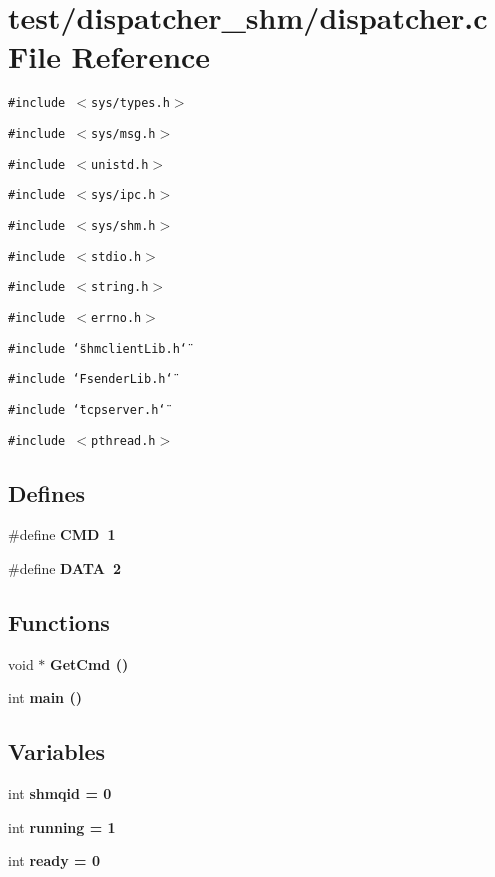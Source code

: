 \section{test/dispatcher\_\-shm/dispatcher.c File Reference}
\label{shm_2dispatcher_8c}
{\tt \#include $<$sys/types.h$>$}\par
{\tt \#include $<$sys/msg.h$>$}\par
{\tt \#include $<$unistd.h$>$}\par
{\tt \#include $<$sys/ipc.h$>$}\par
{\tt \#include $<$sys/shm.h$>$}\par
{\tt \#include $<$stdio.h$>$}\par
{\tt \#include $<$string.h$>$}\par
{\tt \#include $<$errno.h$>$}\par
{\tt \#include \char`\"{}shmclient\-Lib.h\char`\"{}}\par
{\tt \#include \char`\"{}Fsender\-Lib.h\char`\"{}}\par
{\tt \#include \char`\"{}tcpserver.h\char`\"{}}\par
{\tt \#include $<$pthread.h$>$}\par
\subsection*{Defines}
\begin{CompactItemize}
\item 
\#define \bf{CMD}~1
\item 
\#define \bf{DATA}~2
\end{CompactItemize}
\subsection*{Functions}
\begin{CompactItemize}
\item 
void $\ast$ \bf{Get\-Cmd} ()
\item 
int \bf{main} ()
\end{CompactItemize}
\subsection*{Variables}
\begin{CompactItemize}
\item 
int \bf{shmqid} = 0
\item 
int \bf{running} = 1
\item 
int \bf{ready} = 0
\end{CompactItemize}


